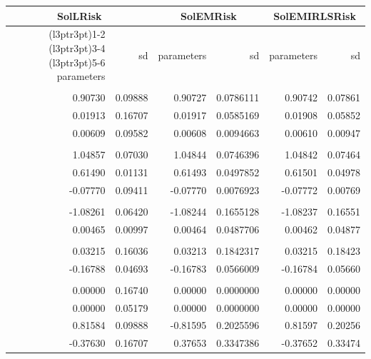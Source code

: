 \documentclass{article}\usepackage[]{graphicx}\usepackage[]{color}
\begin{document}
\begin{table}[H]
\centering
\begin{tabular}{rrrrrr}
\toprule
\multicolumn{2}{c}{SolLRisk} & \multicolumn{2}{c}{SolEMRisk} & \multicolumn{2}{c}{SolEMIRLSRisk} \\
\cmidrule(l{3pt}r{3pt}){1-2} \cmidrule(l{3pt}r{3pt}){3-4} \cmidrule(l{3pt}r{3pt}){5-6}
parameters & sd & parameters & sd & parameters & sd\\
\midrule
\addlinespace[0.3em]
\multicolumn{6}{l}{\textbf{Beta 1}}\\
\hspace{1em}0.90730 & 0.09888 & 0.90727 & 0.0786111 & 0.90742 & 0.07861\\
\hspace{1em}0.01913 & 0.16707 & 0.01917 & 0.0585169 & 0.01908 & 0.05852\\
\hspace{1em}0.00609 & 0.09582 & 0.00608 & 0.0094663 & 0.00610 & 0.00947\\
\addlinespace[0.3em]
\multicolumn{6}{l}{\textbf{Beta 2}}\\
\hspace{1em}1.04857 & 0.07030 & 1.04844 & 0.0746396 & 1.04842 & 0.07464\\
\hspace{1em}0.61490 & 0.01131 & 0.61493 & 0.0497852 & 0.61501 & 0.04978\\
\hspace{1em}-0.07770 & 0.09411 & -0.07770 & 0.0076923 & -0.07772 & 0.00769\\
\addlinespace[0.3em]
\multicolumn{6}{l}{\textbf{Nu 1}}\\
\hspace{1em}-1.08261 & 0.06420 & -1.08244 & 0.1655128 & -1.08237 & 0.16551\\
\hspace{1em}0.00465 & 0.00997 & 0.00464 & 0.0487706 & 0.00462 & 0.04877\\
\addlinespace[0.3em]
\multicolumn{6}{l}{\textbf{Nu 2}}\\
\hspace{1em}0.03215 & 0.16036 & 0.03213 & 0.1842317 & 0.03215 & 0.18423\\
\hspace{1em}-0.16788 & 0.04693 & -0.16783 & 0.0566009 & -0.16784 & 0.05660\\
\addlinespace[0.3em]
\multicolumn{6}{l}{\textbf{Theta}}\\
\hspace{1em}0.00000 & 0.16740 & 0.00000 & 0.0000000 & 0.00000 & 0.00000\\
\hspace{1em}0.00000 & 0.05179 & 0.00000 & 0.0000000 & 0.00000 & 0.00000\\
\hspace{1em}0.81584 & 0.09888 & -0.81595 & 0.2025596 & 0.81597 & 0.20256\\
\hspace{1em}-0.37630 & 0.16707 & 0.37653 & 0.3347386 & -0.37652 & 0.33474\\
\bottomrule
\end{tabular}
\end{table}
\end{document}
